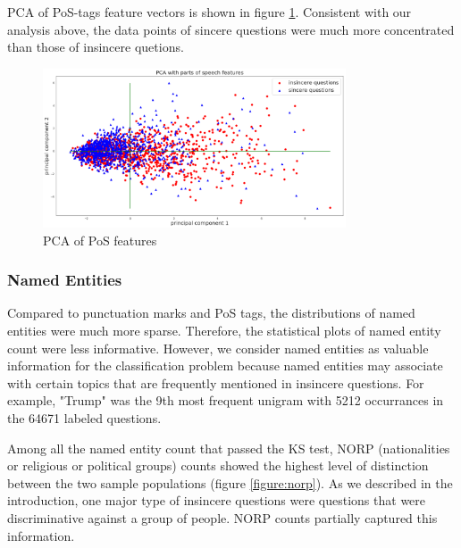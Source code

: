 \documentclass[12pt]{diazessay} %
\begin{document}
{PCA of PoS-tags feature vectors is shown in figure \ref{figure:pospca}. Consistent with our analysis above, the data points of sincere questions were much more concentrated than those of insincere quetions.  

\begin{figure}[ht]
    \includegraphics[width=0.8\textwidth, center]{graphs/pca/2Dpos.png}
    
    \medskip
    \small
    \caption{PCA of PoS features} 
    \label{figure:pospca}
\end{figure}


\subsubsection{Named Entities} %
\label{ssub:named_entities}

Compared to punctuation marks and PoS tags, the distributions of named entities were much more sparse. Therefore, the statistical plots of named entity count were less informative. However, we consider named entities as valuable information for the classification problem because named entities may associate with certain topics that are frequently mentioned in insincere questions. For example, "Trump" was the 9th most frequent unigram with 5212 occurrances in the 64671 labeled questions. 

Among all the named entity count that passed the KS test, NORP (nationalities or religious or political groups) counts showed the highest level of distinction between the two sample populations (figure \ref{figure:norp}). As we described in the introduction, one major type of insincere questions were questions that were discriminative against a group of people. NORP counts partially captured this information. 

}
\end{document}
